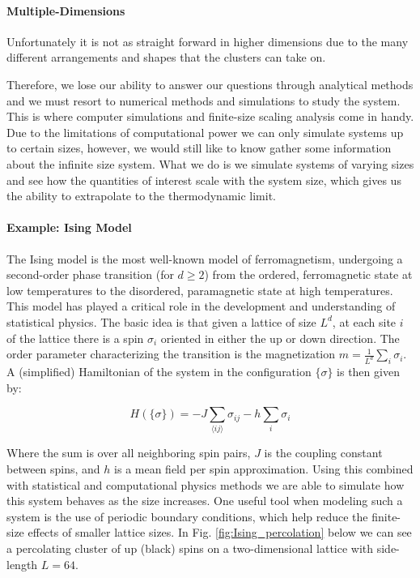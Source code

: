 \paragraph{Multiple-Dimensions}
Unfortunately it is not as straight forward in higher dimensions due to the many different arrangements and shapes that the clusters can take on.


Therefore, we lose our ability to answer our questions through analytical methods and we must resort to numerical methods and simulations to study the system.
This is where computer simulations and finite-size scaling analysis come in handy.
Due to the limitations of computational power we can only simulate systems up to certain sizes, however, we would still like to know gather some information about the infinite size system.
What we do is we simulate systems of varying sizes and see how the quantities of interest scale with the system size, which gives us the ability to extrapolate to the thermodynamic limit.

\paragraph{Example: Ising Model}
The Ising model is the most well-known model of ferromagnetism, undergoing a second-order phase transition (for $d \ge 2$) from the ordered, ferromagnetic state at low temperatures to the disordered, paramagnetic state at high temperatures.
This model has played a critical role in the development and understanding of statistical physics.
The basic idea is that given a lattice of size $L^d$, at each site $i$ of the lattice there is a spin $\sigma_i$ oriented in either the up or down direction.
The order parameter characterizing the transition is the magnetization $m = \frac{1}{L^d} \sum_i \sigma_i$.
A (simplified) Hamiltonian of the system in the configuration $\{\sigma\}$ is then given by:

\begin{equation}
	\label{eqn:Ising_Hamiltonian}
	H(\{\sigma\}) = -J \sum_{\langle i j \rangle} \sigma_{ij} -h \sum_i \sigma_i
\end{equation}

Where the sum is over all neighboring spin pairs, $J$ is the coupling constant between spins, and $h$ is a mean field per spin approximation.
Using this combined with statistical and computational physics methods we are able to simulate how this system behaves as the size increases.
One useful tool when modeling such a system is the use of periodic boundary conditions, which help reduce the finite-size effects of smaller lattice sizes.
In Fig. \ref{fig:Ising_percolation} below we can see a percolating cluster of up (black) spins on a two-dimensional lattice with side-length $L = 64$.

